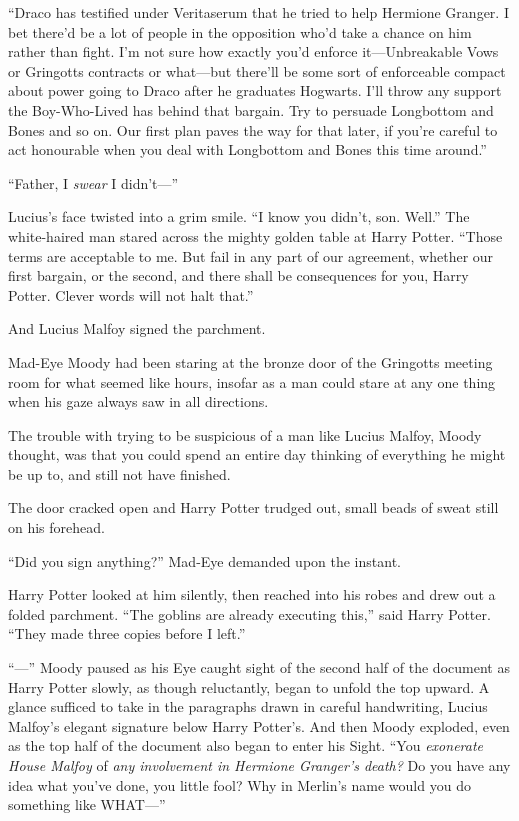 “Draco has testified under Veritaserum that he tried to help Hermione Granger. I bet there’d be a lot of people in the opposition who’d take a chance on him rather than fight. I’m not sure how exactly you’d enforce it—Unbreakable Vows or Gringotts contracts or what—but there’ll be some sort of enforceable compact about power going to Draco after he graduates Hogwarts. I’ll throw any support the Boy-Who-Lived has behind that bargain. Try to persuade Longbottom and Bones and so on. Our first plan paves the way for that later, if you’re careful to act honourable when you deal with Longbottom and Bones this time around.”

“Father, I \emph{swear} I didn’t—”

Lucius’s face twisted into a grim smile. “I know you didn’t, son. Well.” The white-haired man stared across the mighty golden table at Harry Potter. “Those terms are acceptable to me. But fail in any part of our agreement, whether our first bargain, or the second, and there shall be consequences for you, Harry Potter. Clever words will not halt that.”

And Lucius Malfoy signed the parchment.

\later

Mad-Eye Moody had been staring at the bronze door of the Gringotts meeting room for what seemed like hours, insofar as a man could stare at any one thing when his gaze always saw in all directions.

The trouble with trying to be suspicious of a man like Lucius Malfoy, Moody thought, was that you could spend an entire day thinking of everything he might be up to, and still not have finished.

The door cracked open and Harry Potter trudged out, small beads of sweat still on his forehead.

“Did you sign anything?” Mad-Eye demanded upon the instant.

Harry Potter looked at him silently, then reached into his robes and drew out a folded parchment. “The goblins are already executing this,” said Harry Potter. “They made three copies before I left.”

“—” Moody paused as his Eye caught sight of the second half of the document as Harry Potter slowly, as though reluctantly, began to unfold the top upward. A glance sufficed to take in the paragraphs drawn in careful handwriting, Lucius Malfoy’s elegant signature below Harry Potter’s. And then Moody exploded, even as the top half of the document also began to enter his Sight. “You \emph{exonerate House Malfoy} of \emph{any involvement in Hermione Granger’s death?} Do you have any idea what you’ve done, you little fool? Why in Merlin’s name would you do something like WHAT—”

